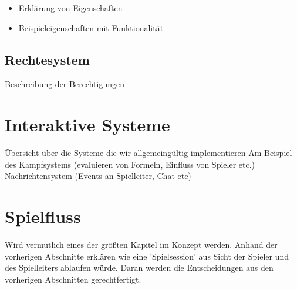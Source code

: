 \begin{itemize}
	\item Erklärung von Eigenschaften
	\item Beispieleigenschaften mit Funktionalität 
\end{itemize}


\subsection{Rechtesystem}
\label{sec:Rechtesystem}
Beschreibung der Berechtigungen



\section{Interaktive Systeme}
\label{sec:InteraktiveSysteme}
Übersicht über die Systeme die wir allgemeingültig implementieren\newline
Am Beispiel des Kampfsystems (evaluieren von Formeln, Einfluss von Spieler etc.)\newline
Nachrichtensystem (Events an Spielleiter, Chat etc)\newline


\section{Spielfluss}
\label{sec:Spielfluss}
Wird vermutlich eines der größten Kapitel im Konzept werden. Anhand der vorherigen Abschnitte erklären wie eine 'Spielsession' aus Sicht der Spieler und des Spielleiters ablaufen würde. Daran werden die Entscheidungen aus den vorherigen Abschnitten gerechtfertigt.\newline
{}
